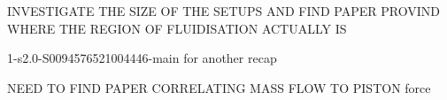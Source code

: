 INVESTIGATE THE SIZE OF THE SETUPS AND FIND PAPER PROVIND WHERE THE REGION OF FLUIDISATION ACTUALLY IS

1-s2.0-S0094576521004446-main for another recap



NEED TO FIND PAPER CORRELATING MASS FLOW TO PISTON force
\newpage
